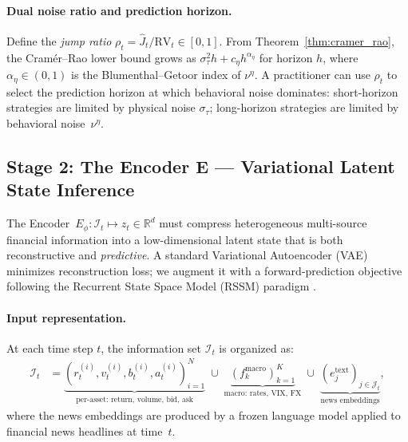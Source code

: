\documentclass[12pt,a4paper]{article}
\theoremstyle{plain}
\theoremstyle{definition}
\newcommand{\R}{\mathbb{R}}
\newcommand{\1}{\mathbbm{1}}
\begin{document}
\paragraph{Dual noise ratio and prediction horizon.}
Define the \emph{jump ratio}
$\rho_t = \widehat{J}_t / \mathrm{RV}_t \in [0,1]$.
From Theorem~\ref{thm:cramer_rao}, the Cramér–Rao lower bound grows as
$\sigma_\tau^2 h + c_\eta h^{\alpha_\eta}$ for horizon $h$, where
$\alpha_\eta \in (0,1)$ is the Blumenthal–Getoor index of $\nu^\eta$.
A practitioner can use $\rho_t$ to select the prediction horizon at which
behavioral noise dominates: short-horizon strategies are limited by physical noise
$\sigma_\tau$; long-horizon strategies are limited by behavioral noise~$\nu^\eta$.

\subsection{Stage 2: The Encoder E — Variational Latent State Inference}
\label{subsec:encoder_impl}

The Encoder~$E_\phi: \mathcal{I}_t \mapsto z_t \in \R^d$ must compress
heterogeneous multi-source financial information into a low-dimensional latent
state that is both reconstructive and \emph{predictive}.  A standard Variational
Autoencoder (VAE) \citep{KingmaWelling2014} minimizes reconstruction loss; we
augment it with a forward-prediction objective following the Recurrent State
Space Model (RSSM) paradigm \citep{Hafner2019RSSM}.

\paragraph{Input representation.}
At each time step $t$, the information set $\mathcal{I}_t$ is organized as:
\begin{align*}
\mathcal{I}_t &= \underbrace{(r^{(i)}_t, v^{(i)}_t, b^{(i)}_t, a^{(i)}_t)_{i=1}^N}_{\text{per-asset: return, volume, bid, ask}}
\;\cup\;
\underbrace{(f^\mathrm{macro}_k)_{k=1}^K}_{\text{macro: rates, VIX, FX}}
\;\cup\;
\underbrace{(e^\mathrm{text}_j)_{j \in \mathcal{J}_t}}_{\text{news embeddings}},
\end{align*}
where the news embeddings are produced by a frozen language model applied to
financial news headlines at time~$t$.
\end{document}
